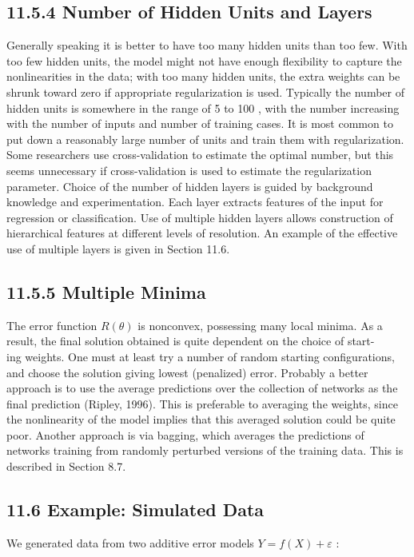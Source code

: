\documentclass[10pt]{article}
\begin{document}
\subsection*{11.5.4 Number of Hidden Units and Layers}
Generally speaking it is better to have too many hidden units than too few. With too few hidden units, the model might not have enough flexibility to capture the nonlinearities in the data; with too many hidden units, the extra weights can be shrunk toward zero if appropriate regularization is used. Typically the number of hidden units is somewhere in the range of 5 to 100 , with the number increasing with the number of inputs and number of training cases. It is most common to put down a reasonably large number of units and train them with regularization. Some researchers use cross-validation to estimate the optimal number, but this seems unnecessary if cross-validation is used to estimate the regularization parameter. Choice of the number of hidden layers is guided by background knowledge and experimentation. Each layer extracts features of the input for regression or classification. Use of multiple hidden layers allows construction of hierarchical features at different levels of resolution. An example of the effective use of multiple layers is given in Section 11.6.

\subsection*{11.5.5 Multiple Minima}
The error function $R(\theta)$ is nonconvex, possessing many local minima. As a result, the final solution obtained is quite dependent on the choice of start-\\
ing weights. One must at least try a number of random starting configurations, and choose the solution giving lowest (penalized) error. Probably a better approach is to use the average predictions over the collection of networks as the final prediction (Ripley, 1996). This is preferable to averaging the weights, since the nonlinearity of the model implies that this averaged solution could be quite poor. Another approach is via bagging, which averages the predictions of networks training from randomly perturbed versions of the training data. This is described in Section 8.7.

\subsection*{11.6 Example: Simulated Data}
We generated data from two additive error models $Y=f(X)+\varepsilon$ :
\end{document}
